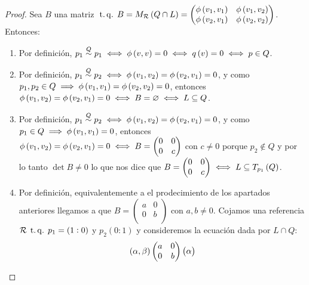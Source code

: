 \begin{proof}
  Sea $B$ una matriz $\operatorname{\;t.q.\;} B=M_{\mathcal{R}} \left( Q\cap L\right) = \begin{pmatrix}
    \phi\left( v_1,v_1\right) & \phi\left( v_1,v_2\right)\\
    \phi\left( v_2,v_1\right) & \phi\left( v_2,v_2\right)\\
   \end{pmatrix}$. Entonces:
  \begin{enumerate}[(1)]
   \item Por definición, $p_1 \stackrel{Q}{\sim} p_1 \iff \phi\left( v,v\right)=0 \iff q\left( v\right)=0 \iff p\in Q$.
   \item Por definición, $p_1 \stackrel{Q}{\sim} p_2 \iff \phi\left( v_1,v_2\right)=\phi\left( v_2,v_1\right)=0$, y como
   $p_1,p_2\in Q \implies \phi\left( v_1,v_1\right)=\phi\left( v_2,v_2\right)=0$, entonces $\phi\left( v_1,v_2\right)=
   \phi\left( v_2,v_1\right)=0 \iff B=\varnothing \iff L\subseteq Q$.
   \item Por definición, $p_1 \stackrel{Q}{\sim} p_2 \iff \phi\left( v_1,v_2\right)=\phi\left( v_2,v_1\right)=0$, y como 
   $p_1\in Q \implies \phi\left( v_1,v_1\right)=0$, entonces $\phi\left( v_1,v_2\right)=
   \phi\left( v_2,v_1\right)=0 \iff B= 
   \begin{pmatrix}
   0 & 0\\
   0 & c\\
   \end{pmatrix}$ con $c\neq 0$ porque $p_2 \not\in Q$ y por lo tanto $\det B \neq 0$ lo que nos dice que 
   $B= 
   \begin{pmatrix}
   0 & 0\\
   0 & c\\
   \end{pmatrix} \iff L\subseteq T_{p_1}\left( Q\right)$.
   \item Por definición, equivalentemente a el prodecimiento de los apartados anteriores llegamos a que $B=
   \begin{pmatrix}
    a & 0\\
    0 & b\\
   \end{pmatrix}$ con $a,b\neq 0$. Cojamos una referencia $\mathcal{R} \operatorname{\;t.q.\;} p_1=\left( 1:0\right)$ y $p_2(0:1)$ y consideremos la ecuación dada por $L\cap Q$:
   \[
    \left( \alpha,\beta\right)
    \begin{pmatrix}
     a & 0\\
     0 & b\\
    \end{pmatrix}
    \begin{pmatrix}
     \alpha\\

\end{pmatrix}\]
\end{enumerate}
\end{proof}
